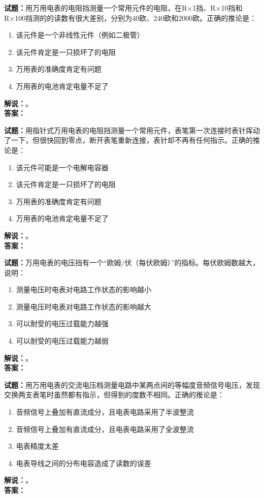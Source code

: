 \documentclass{ctexbook}
\begin{document}
\vspace{\baselineskip}

\noindent\textbf{试题：}用万用电表的电阻挡测量一个常用元件的电阻，在R×1挡、R×10挡和R×100挡测的的读数有很大差别，分别为40欧、240欧和2000欧。正确的推论是：
\begin{enumerate}[leftmargin=3em]
  \item 该元件是一个非线性元件（例如二极管）
  \item 该元件肯定是一只损坏了的电阻
  \item 万用表的准确度肯定有问题
  \item 万用表的电池肯定电量不足了
\end{enumerate}
\noindent\textbf{解说：}\textbf{}。\\\noindent\textbf{答案：}

\vspace{\baselineskip}

\noindent\textbf{试题：}用指针式万用电表的电阻挡测量一个常用元件，表笔第一次连接时表针挥动了一下，但很快回到零点，断开表笔重新连接，表针却不再有任何指示。正确的推论是：
\begin{enumerate}[leftmargin=3em]
  \item 该元件可能是一个电解电容器
  \item 该元件肯定是一只损坏了的电阻
  \item 万用表的准确度肯定有问题
  \item 万用表的电池肯定电量不足了
\end{enumerate}
\noindent\textbf{解说：}\textbf{}。\\\noindent\textbf{答案：}

\vspace{\baselineskip}

\noindent\textbf{试题：}万用电表的电压挡有一个“欧姆/伏（每伏欧姆）”的指标。每伏欧姆数越大，说明：
\begin{enumerate}[leftmargin=3em]
  \item 测量电压时电表对电路工作状态的影响越小
  \item 测量电压时电表对电路工作状态的影响越大
  \item 可以耐受的电压过载能力越强
  \item 可以耐受的电压过载能力越弱
\end{enumerate}
\noindent\textbf{解说：}\textbf{}。\\\noindent\textbf{答案：}

\vspace{\baselineskip}

\noindent\textbf{试题：}用万用电表的交流电压档测量电路中某两点间的等幅度音频信号电压，发现交换两支表笔时虽然都有指示，但得到的度数不相同。正确的推论是：
\begin{enumerate}[leftmargin=3em]
  \item 音频信号上叠加有直流成分，且电表电路采用了半波整流
  \item 音频信号上叠加有直流成分，且电表电路采用了全波整流
  \item 电表精度太差
  \item 电表导线之间的分布电容造成了读数的误差
\end{enumerate}
\noindent\textbf{解说：}\textbf{}。\\\noindent\textbf{答案：}
\end{document}
